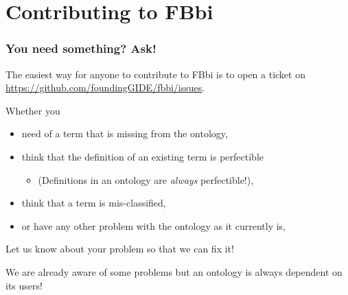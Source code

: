 \section{Contributing to FBbi}

\begin{frame}
  \frametitle{You need something? Ask!}

  \begin{block}{}
    The easiest way for anyone to contribute to FBbi is to open a ticket
    on \url{https://github.com/foundingGIDE/fbbi/issues}.
  \end{block}

  \bigskip
  Whether you
  \begin{itemize}
    \item need of a term that is missing from the ontology,
    \item think that the definition of an existing term is perfectible
    \begin{itemize}
      \item (Definitions in an ontology are \emph{always} perfectible!),
    \end{itemize}
    \item think that a term is mis-classified,
    \item or have any other problem with the ontology as it currently
    is,
  \end{itemize}

  \bigskip
  Let us know about your problem so that we can fix it!

  \bigskip
  We are already aware of some problems but an ontology is always
  dependent on its users!

\end{frame}

